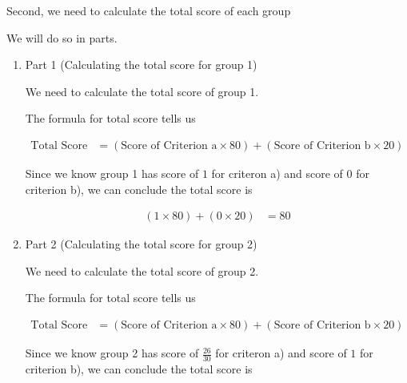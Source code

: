 \documentclass[12pt]{article}
\begin{document}
\begin{mdframed}
\begin{itemize}
        \bigskip

        Second, we need to calculate the total score of each group

        \bigskip

        We will do so in parts.


        \begin{enumerate}[1.]
            \item Part 1 (Calculating the total score for group 1)

            \begin{mdframed}
                We need to calculate the total score of group 1.

                \bigskip

                The formula for total score tells us

                \begin{align}
                    \text{Total Score} &= (\text{Score of Criterion a} \times 80) + (\text{Score of Criterion b} \times 20)
                \end{align}

                \bigskip

                Since we know group 1 has score of $1$ for criteron a) and score of $0$ for
                criterion b), we can conclude the total score is

                \begin{align}
                    (1 \times 80) + (0 \times 20) &= 80
                \end{align}
            \end{mdframed}

            \item Part 2 (Calculating the total score for group 2)

            \begin{mdframed}
                We need to calculate the total score of group 2.

                \bigskip

                The formula for total score tells us

                \begin{align}
                    \text{Total Score} &= (\text{Score of Criterion a} \times 80) + (\text{Score of Criterion b} \times 20)
                \end{align}

                \bigskip

                Since we know group 2 has score of $\frac{26}{30}$ for criteron a) and score of $1$ for
                criterion b), we can conclude the total score is


\end{mdframed}
\end{enumerate}
\end{itemize}
\end{mdframed}
\end{document}
